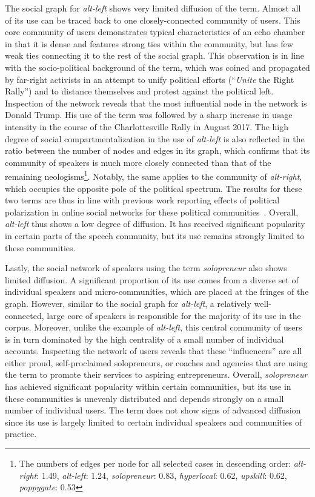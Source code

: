 \documentclass[
  a4paper,
  abstract=on,
  captions=tableabove,
  ]{scrartcl}
\newcommand{\ol}[1]{\emph{#1}}
\begin{document}
      The social graph for \ol{alt-left} shows very limited diffusion of the term. Almost all of its use can be traced back to one closely-connected community of users. This core community of users demonstrates typical characteristics of an echo chamber in that it is dense and features strong ties within the community, but has few weak ties connecting it to the rest of the social graph. This observation is in line with the socio-political background of the term, which was coined and propagated by far-right activists in an attempt to unify political efforts (\enquote{\emph{Unite} the Right Rally}) and to distance themselves and protest against the political left. Inspection of the network reveals that the most influential node in the network is Donald Trump. His use of the term was followed by a sharp increase in usage intensity in the course of the Charlottesville Rally in August 2017. The high degree of social compartmentalization in the use of \ol{alt-left} is also reflected in the ratio between the number of nodes and edges in its graph, which confirms that its community of speakers is much more closely connected than that of the remaining neologisms\footnote{The numbers of edges per node for all selected cases in descending order: \ol{alt-right}: \num{1.49}, \ol{alt-left}: \num{1.24}, \ol{solopreneur}: \num{0.83}, \ol{hyperlocal}: \num{0.62}, \ol{upskill}: \num{0.62}, \ol{poppygate}: \num{0.53}}. Notably, the same applies to the community of \ol{alt-right}, which occupies the opposite pole of the political spectrum. The results for these two terms are thus in line with previous work reporting effects of political polarization in online social networks for these political communities~\parencite{Sunstein2018RepublicDivided}. Overall, \ol{alt-left} thus shows a low degree of diffusion. It has received significant popularity in certain parts of the speech community, but its use remains strongly limited to these communities.

      Lastly, the social network of speakers using the term \ol{solopreneur} also shows limited diffusion. A significant proportion of its use comes from a diverse set of individual speakers and micro-communities, which are placed at the fringes of the graph. However, similar to the social graph for \ol{alt-left}, a relatively well-connected, large core of speakers is responsible for the majority of its use in the corpus. Moreover, unlike the example of \ol{alt-left}, this central community of users is in turn dominated by the high centrality of a small number of individual accounts. Inspecting the network of users reveals that these \enquote{influencers} are all either proud, self-proclaimed solopreneurs, or coaches and agencies that are using the term to promote their services to aspiring entrepreneurs. Overall, \ol{solopreneur} has achieved significant popularity within certain communities, but its use in these communities is unevenly distributed and depends strongly on a small number of individual users. The term does not show signs of advanced diffusion since its use is largely limited to certain individual speakers and communities of practice.
\end{document}
